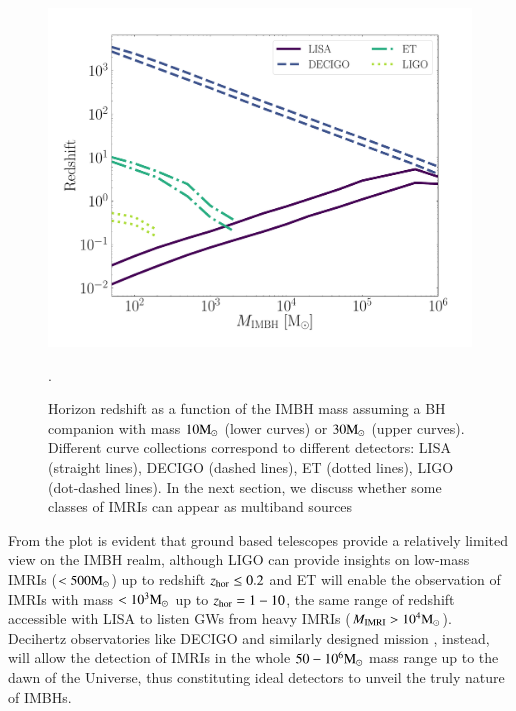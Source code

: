 \documentclass[article]{aa}
\newcommand{\Ms}{{\rm M}_\odot}
\newcommand{\imri}{{\rm IMRI}}
\begin{document}
\begin{figure}
\centering
\includegraphics[width=\columnwidth]{horizon}
\caption{Horizon redshift as a function of the IMBH mass assuming a BH companion with mass $10 \Ms$ (lower curves) or $30\Ms$ (upper curves). Different curve collections correspond to different detectors: LISA (straight lines), DECIGO (dashed lines), ET (dotted lines), LIGO (dot-dashed lines). In the next section, we discuss whether some classes of IMRIs can appear as multiband sources}.
\label{fig:fhor}
\end{figure}

From the plot is evident that ground based telescopes provide a relatively limited view on the IMBH realm, although LIGO can provide insights on low-mass IMRIs ($<500\Ms$) up to redshift $z_{\rm hor} \leq 0.2$ and ET will enable the observation of IMRIs with mass $<10^3\Ms$ up to $z_{\rm hor} = 1-10$, the same range of redshift accessible with LISA to listen GWs from heavy IMRIs ($M_{\imri}>10^4\Ms$). Decihertz observatories like DECIGO \citep{Kawamura11} and similarly designed mission \citep{arca19}, instead, will allow the detection of IMRIs in the whole $50-10^6\Ms$ mass range up to the dawn of the Universe, thus constituting ideal detectors to unveil the truly nature of IMBHs. 
\end{document}
